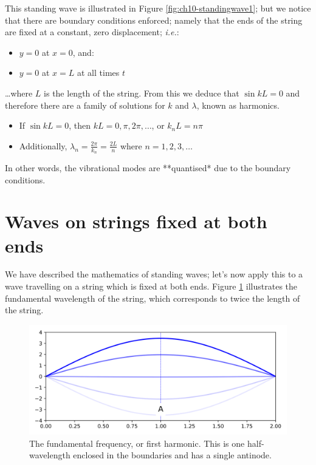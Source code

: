 \documentclass[
]{book}
\providecommand{\tightlist}{%
  \setlength{\itemsep}{0pt}\setlength{\parskip}{0pt}}
\begin{document}
This standing wave is illustrated in Figure \ref{fig:ch10-standingwave1}; but we notice that there are boundary conditions enforced; namely that the ends of the string are fixed at a constant, zero displacement; \emph{i.e.}:

\begin{itemize}
\tightlist
\item
  \(y = 0\) at \(x = 0\), and:
\item
  \(y = 0\) at \(x = L\) at all times \(t\)
\end{itemize}

\ldots where \(L\) is the length of the string. From this we deduce that \(\sin kL = 0\) and therefore there are a family of solutions for \(k\) and \(\lambda\), known as harmonics.

\begin{itemize}
\tightlist
\item
  If \(\sin kL = 0\), then \(kL = 0, \pi, 2\pi, \dots\), or \(k_n L = n\pi\)
\item
  Additionally, \(\lambda_n = \frac{2\pi}{k_n} = \frac{2L}{n}\) where \(n = 1, 2, 3, \dots\)
\end{itemize}

In other words, the vibrational modes are **quantised* due to the boundary conditions.

\hypertarget{sec:ch10-fixedstring1}{%
\section{Waves on strings fixed at both ends}\label{sec:ch10-fixedstring1}}

We have described the mathematics of standing waves; let's now apply this to a wave travelling on a string which is fixed at both ends. Figure \ref{fig:ch10-stringfundamental1} illustrates the fundamental wavelength of the string, which corresponds to twice the length of the string.

\begin{figure}

{\centering \includegraphics[width=0.7\linewidth]{visualisations/ch10-standingwave_stages-n1} 

}

\caption{The fundamental frequency, or first harmonic. This is one half-wavelength enclosed in the boundaries and has a single antinode.}\label{fig:ch10-stringfundamental1}
\end{figure}
\end{document}
